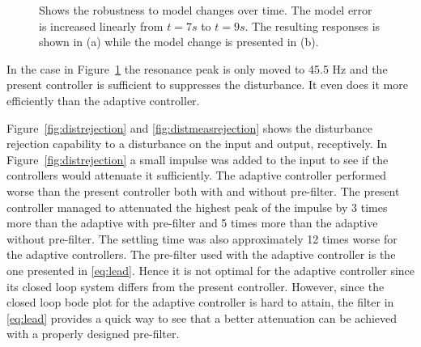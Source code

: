 \begin{figure}[h!]
  \centering %
  \qquad
  \caption{\label{fig:modelerror}Shows the robustness to model changes over time. The model error is increased linearly from $t=7s$ to $t=9s$. The resulting responses is shown in (a) while the model change is presented in (b).}
\end{figure}

In the case in Figure~\ref{fig:modelerror} the resonance peak is only moved to 45.5 Hz and the present controller is sufficient to suppresses the disturbance. It even does it more efficiently than the adaptive controller.

Figure~\ref{fig:distrejection} and \ref{fig:distmeasrejection} shows the disturbance rejection capability to a disturbance on the input and output, receptively. In Figure~\ref{fig:distrejection} a small impulse was added to the input to see if the controllers would attenuate it sufficiently. The adaptive controller performed worse than the present controller both with and without pre-filter. The present controller managed to attenuated the highest peak of the impulse by 3 times more than the adaptive with pre-filter and 5 times more than the adaptive without pre-filter. The settling time was also approximately 12 times worse for the adaptive controllers. The pre-filter used with the adaptive controller is the one presented in \eqref{eq:lead}. Hence it is not optimal for the adaptive controller since its closed loop system differs from the present controller. However, since the closed loop bode plot for the adaptive controller is hard to attain, the filter in \eqref{eq:lead} provides a quick way to see that a better attenuation can be achieved with a properly designed pre-filter.

